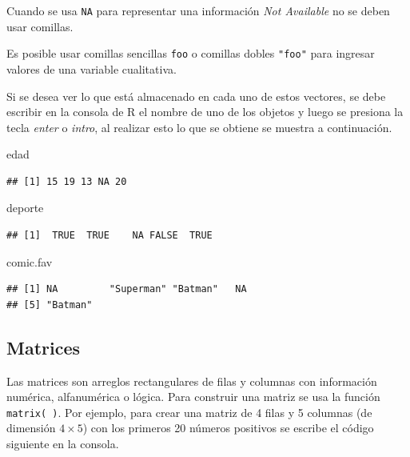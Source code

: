 \documentclass[10pt,]{krantz}
\makeatletter
\newenvironment{Shaded}{\begin{snugshade}}{\end{snugshade}}
\newcommand{\NormalTok}[1]{{#1}}
\let\proglang=\textsf
\newenvironment{kframe}{%
\medskip{}
\setlength{\fboxsep}{.8em}
 \def\at@end@of@kframe{}%
 \ifinner\ifhmode%
  \def\at@end@of@kframe{\end{minipage}}%
  \begin{minipage}{\columnwidth}%
 \fi\fi%
 \def\FrameCommand##1{\hskip\@totalleftmargin \hskip-\fboxsep
 \colorbox{shadecolor}{##1}\hskip-\fboxsep
     \hskip-\linewidth \hskip-\@totalleftmargin \hskip\columnwidth}%
 \MakeFramed {\advance\hsize-\width
   \@totalleftmargin\z@ \linewidth\hsize
   \@setminipage}}%
 {\par\unskip\endMakeFramed%
 \at@end@of@kframe}
\renewenvironment{Shaded}{\begin{kframe}}{\end{kframe}}
\let\BeginKnitrBlock\begin \let\EndKnitrBlock\end
\makeatother
\begin{document}
\BeginKnitrBlock{rmdwarning}
Cuando se usa \texttt{NA} para representar una información
\textit{Not Available} no se deben usar comillas.
\EndKnitrBlock{rmdwarning}

\BeginKnitrBlock{rmdnote}
Es posible usar comillas sencillas
\texttt{\textquotesingle{}foo\textquotesingle{}} o comillas dobles
\texttt{"foo"} para ingresar valores de una variable cualitativa.
\EndKnitrBlock{rmdnote}

Si se desea ver lo que está almacenado en cada uno de estos vectores, se
debe escribir en la consola de \proglang{R} el nombre de uno de los
objetos y luego se presiona la tecla \textit{enter} o \textit{intro}, al
realizar esto lo que se obtiene se muestra a continuación.

\begin{Shaded}
\begin{Highlighting}[]
\NormalTok{edad}
\end{Highlighting}
\end{Shaded}

\begin{verbatim}
## [1] 15 19 13 NA 20
\end{verbatim}

\begin{Shaded}
\begin{Highlighting}[]
\NormalTok{deporte}
\end{Highlighting}
\end{Shaded}

\begin{verbatim}
## [1]  TRUE  TRUE    NA FALSE  TRUE
\end{verbatim}

\begin{Shaded}
\begin{Highlighting}[]
\NormalTok{comic.fav}
\end{Highlighting}
\end{Shaded}

\begin{verbatim}
## [1] NA         "Superman" "Batman"   NA        
## [5] "Batman"
\end{verbatim}

\subsection{Matrices}

Las matrices  son arreglos rectangulares de filas y
columnas con información numérica, alfanumérica o lógica. Para construir
una matriz se usa la función \texttt{matrix(\ )}. Por ejemplo, para
crear una matriz de 4 filas y 5 columnas (de dimensión \(4 \times 5\))
con los primeros 20 números positivos se escribe el código siguiente en
la consola.
\end{document}
